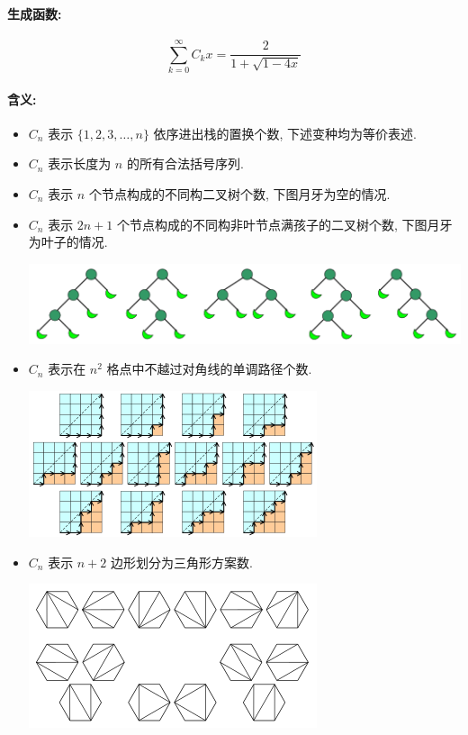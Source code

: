 \paragraph{生成函数:}
\[\sum_{k=0}^\infty C_kx=\frac2{1+\sqrt{1-4x}}\]
\paragraph{含义:}
\begin{itemize}
  \item $C_n$ 表示 $\{1,2,3,\ldots,n\}$ 依序进出栈的置换个数, 下述变种均为等价表述.
  \item $C_n$ 表示长度为 $n$ 的所有合法括号序列.
  \item $C_n$ 表示 $n$ 个节点构成的不同构二叉树个数, 下图月牙为空的情况.
  \item $C_n$ 表示 $2n+1$ 个节点构成的不同构非叶节点满孩子的二叉树个数, 下图月牙为叶子的情况.
    \begin{center}
      \includegraphics[scale=.5]{SEQ/Catalan_number_binary_tree_example.png}
    \end{center}
  \item $C_n$ 表示在 $n^2$ 格点中不越过对角线的单调路径个数.
    \begin{center}
      \includegraphics[scale=.5,natwidth=320,natheight=162]{SEQ/320px-Catalan_number_4x4_grid_example.svg.png}
    \end{center}
  \item $C_n$ 表示 $n+2$ 边形划分为三角形方案数.
    \begin{center}
      \includegraphics[scale=.5,natwidth=320,natheight=160]{SEQ/320px-Catalan-Hexagons-example.svg.png}

\end{center}
\end{itemize}
